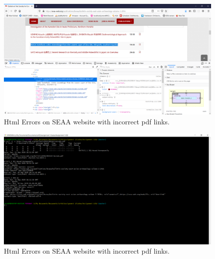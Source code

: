 \documentclass[12pt]{article}
\begin{document}
\begin{figure}[H]
    \centering
    \includegraphics[trim=0 60 10 20, clip, width=\textwidth] {Q3/seaaBadHTML.png}
    \caption{Html Errors on SEAA website with incorrect pdf links. }
    \label{fig:q3SEAA_badHTML}
\end{figure}

\begin{figure}[H]
    \centering
    \includegraphics[trim=0 60 10 20, clip, width=\textwidth] {Q3/seaaBadHTML_curl.png}
    \caption{Html Errors on SEAA website with incorrect pdf links. }
    \label{fig:q3SEAA_badHTML_curl}
\end{figure}
\end{document}
